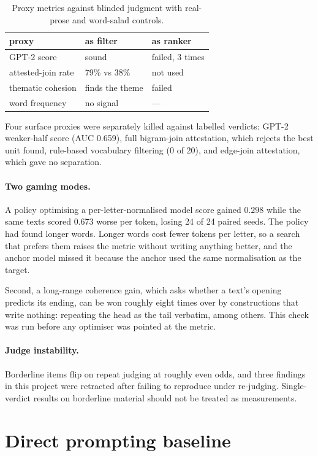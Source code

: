 \documentclass[11pt]{article}
\begin{document}
\begin{table}[t]
\centering\small
\begin{tabular}{@{}lll@{}}
\toprule
proxy & as filter & as ranker \\
\midrule
GPT-2 score & sound & failed, 3 times \\
attested-join rate & 79\% vs 38\% & not used \\
thematic cohesion & finds the theme & failed \\
word frequency & no signal & --- \\
\bottomrule
\end{tabular}
\caption{Proxy metrics against blinded judgment with real-prose and
word-salad controls.}
\label{tab:proxies}
\end{table}

Four surface proxies were separately killed against labelled verdicts: GPT-2
weaker-half score (AUC 0.659), full bigram-join attestation, which rejects the
best unit found, rule-based vocabulary filtering (0 of 20), and edge-join
attestation, which gave no separation.

\paragraph{Two gaming modes.}
A policy optimising a per-letter-normalised model score gained $0.298$ while
the same texts scored $0.673$ worse per token, losing 24 of 24 paired seeds.
The policy had found longer words. Longer words cost fewer tokens per letter,
so a search that prefers them raises the metric without writing anything
better, and the anchor model missed it because the anchor used the same
normalisation as the target.

Second, a long-range coherence gain, which asks whether a text's opening
predicts its ending, can be won roughly eight times over by constructions that
write nothing: repeating the head as the tail verbatim, among others. This
check was run before any optimiser was pointed at the metric.

\paragraph{Judge instability.}
Borderline items flip on repeat judging at roughly even odds, and three
findings in this project were retracted after failing to reproduce under
re-judging. Single-verdict results on borderline material should not be
treated as measurements.

\section{Direct prompting baseline}
\label{sec:llm}
\end{document}
